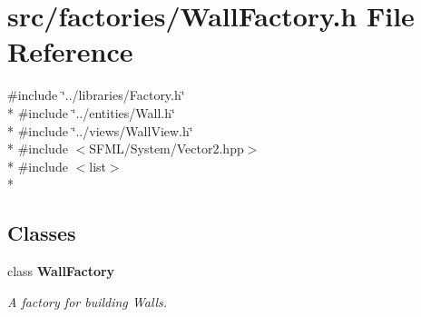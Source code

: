 \section{src/factories/\-Wall\-Factory.h File Reference}
\label{_wall_factory_8h}
{\ttfamily \#include \char`\"{}../libraries/\-Factory.\-h\char`\"{}}\\*
{\ttfamily \#include \char`\"{}../entities/\-Wall.\-h\char`\"{}}\\*
{\ttfamily \#include \char`\"{}../views/\-Wall\-View.\-h\char`\"{}}\\*
{\ttfamily \#include $<$S\-F\-M\-L/\-System/\-Vector2.\-hpp$>$}\\*
{\ttfamily \#include $<$list$>$}\\*
\subsection*{Classes}
\begin{DoxyCompactItemize}
\item 
class {\bf Wall\-Factory}
\begin{DoxyCompactList}\small\item\em A factory for building Walls. \end{DoxyCompactList}\end{DoxyCompactItemize}
